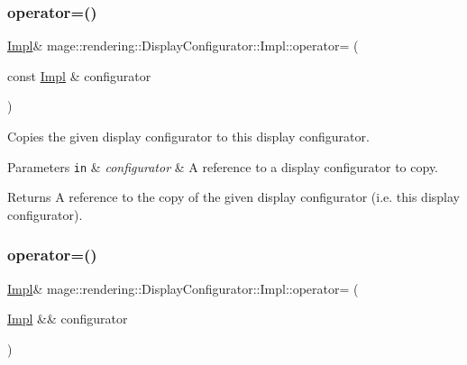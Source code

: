 \subsubsection{\texorpdfstring{operator=()}{operator=()}\hspace{0.1cm}{\footnotesize\ttfamily [1/2]}}
{\footnotesize\ttfamily \hyperlink{classmage_1_1rendering_1_1_display_configurator_1_1_impl}{Impl}\& mage\+::rendering\+::\+Display\+Configurator\+::\+Impl\+::operator= (\begin{DoxyParamCaption}\item[{const \hyperlink{classmage_1_1rendering_1_1_display_configurator_1_1_impl}{Impl} \&}]{configurator }\end{DoxyParamCaption})\hspace{0.3cm}{\ttfamily [delete]}}

Copies the given display configurator to this display configurator.


\begin{DoxyParams}[1]{Parameters}
\mbox{\tt in}  & {\em configurator} & A reference to a display configurator to copy. \\
\hline
\end{DoxyParams}
\begin{DoxyReturn}{Returns}
A reference to the copy of the given display configurator (i.\+e. this display configurator). 
\end{DoxyReturn}
\hypertarget{classmage_1_1rendering_1_1_display_configurator_1_1_impl_a8e8c87b0dea178867baaa737517d9ed0}{}\label{classmage_1_1rendering_1_1_display_configurator_1_1_impl_a8e8c87b0dea178867baaa737517d9ed0} 
\subsubsection{\texorpdfstring{operator=()}{operator=()}\hspace{0.1cm}{\footnotesize\ttfamily [2/2]}}
{\footnotesize\ttfamily \hyperlink{classmage_1_1rendering_1_1_display_configurator_1_1_impl}{Impl}\& mage\+::rendering\+::\+Display\+Configurator\+::\+Impl\+::operator= (\begin{DoxyParamCaption}\item[{\hyperlink{classmage_1_1rendering_1_1_display_configurator_1_1_impl}{Impl} \&\&}]{configurator }\end{DoxyParamCaption})\hspace{0.3cm}{\ttfamily [delete]}}

